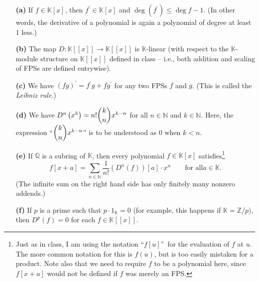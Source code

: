 \documentclass[paper=a4, fontsize=12pt]{scrartcl}%
\let\sumnonlimits\sum
\renewcommand{\sum}{\sumnonlimits\limits}
\theoremstyle{plainsl}
\theoremstyle{definition}
\theoremstyle{remark}
\begin{document}
\begin{enumerate}
\item[\textbf{(a)}] If $f \in\mathbb{K}\left[  x \right]  $, then $f^{\prime
}\in\mathbb{K}\left[  x \right]  $ and $\deg\left(  f^{\prime}\right)
\leq\deg f - 1$. (In other words, the derivative of a polynomial is again a
polynomial of degree at least $1$ less.)

\item[\textbf{(b)}] The map $D : \mathbb{K}\left[  \left[  x \right]  \right]
\to\mathbb{K}\left[  \left[  x \right]  \right]  $ is $\mathbb{K}$-linear
(with respect to the $\mathbb{K}$-module structure on $\mathbb{K}\left[
\left[  x \right]  \right]  $ defined in class -- i.e., both addition and
scaling of FPSs are defined entrywise).

\item[\textbf{(c)}] We have $\left(  fg \right)  ^{\prime}= f^{\prime}g + f
g^{\prime}$ for any two FPSs $f$ and $g$. (This is called the \textit{Leibniz
rule}.)

\item[\textbf{(d)}] We have $D^{n} \left(  x^{k} \right)  = n! \dbinom{k}{n}
x^{k-n}$ for all $n \in\mathbb{N}$ and $k \in\mathbb{N}$. Here, the expression
``$\dbinom{k}{n} x^{k-n}$'' is to be understood as $0$ when $k < n $.

\item[\textbf{(e)}] If $\mathbb{Q}$ is a subring of $\mathbb{K}$, then every
polynomial $f\in\mathbb{K}\left[  x\right]  $ satisfies\footnote{Just as in
class, I am using the notation \textquotedblleft$f\left[  u\right]
$\textquotedblright\ for the evaluation of $f$ at $u$. The more common
notation for this is $f\left(  u\right)  $, but is too easily mistaken for a
product. \newline Note also that we need to require $f$ to be a polynomial
here, since $f\left[  x+a\right]  $ would not be defined if $f$ was merely an
FPS.}
\[
f\left[  x+a\right]  =\sum_{n\in\mathbb{N}}\dfrac{1}{n!}\left(  D^{n}\left(
f\right)  \right)  \left[  a\right]  \cdot x^{n}\qquad\text{for all
$a\in\mathbb{K}$}.
\]
(The infinite sum on the right hand side has only finitely many nonzero addends.)

\item[\textbf{(f)}] If $p$ is a prime such that $p\cdot1_{\mathbb{K}}=0$ (for
example, this happens if $\mathbb{K}=\mathbb{Z}/p$), then $D^{p}\left(
f\right)  =0$ for each $f\in\mathbb{K}\left[  \left[  x\right]  \right]  $.
\end{enumerate}
\end{document}
